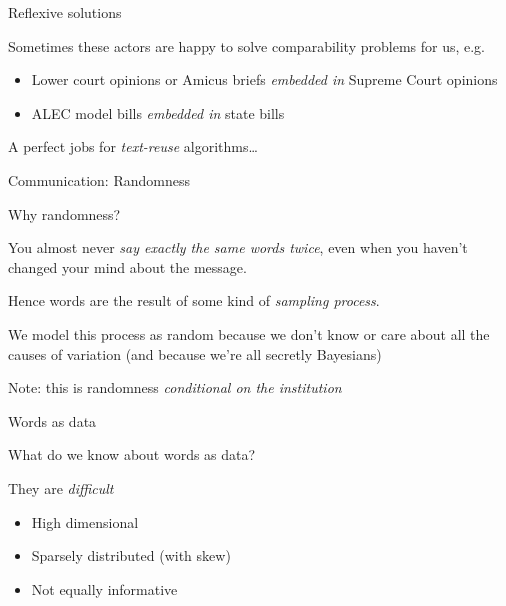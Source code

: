 \documentclass{hertieteaching}\usepackage[]{graphicx}\usepackage[]{color}
\begin{document}
\begin{frame}{Reflexive solutions}

Sometimes these actors are happy to solve comparability problems for us, e.g.
\begin{itemize}
  \item Lower court opinions \parencite{Corley.etal2011} or Amicus briefs \parencite{Collins.etal2015} \textit{embedded in} Supreme Court opinions
  \item ALEC model bills \textit{embedded in} state bills \parencite{Garrett.Jansa2015}
\end{itemize}

A perfect jobs for \textit{text-reuse} algorithms\ldots

\end{frame}

\begin{frame}{Communication: Randomness}

Why randomness?

You almost never \textit{say exactly the same words twice},
even when you haven't changed your mind about the message.

Hence words are the result of some kind of \textit{sampling process}.

We model this process as random because we don't know or care about
all the causes of variation (and because we're all secretly Bayesians)

Note: this is randomness \textit{conditional on the institution}

\end{frame}

{
\begin{frame}
\vfill
\vspace{10ex}
\centerline{\Huge\color{gray}\decorativeflower}
\vfill
\end{frame}
}

\begin{frame}{Words as data}

What do we know about words as data?

They are \textit{difficult}
\begin{itemize}
  \item High dimensional
  \item Sparsely distributed (with skew)
  \item Not equally informative
\end{itemize}

\end{frame}
\end{document}
